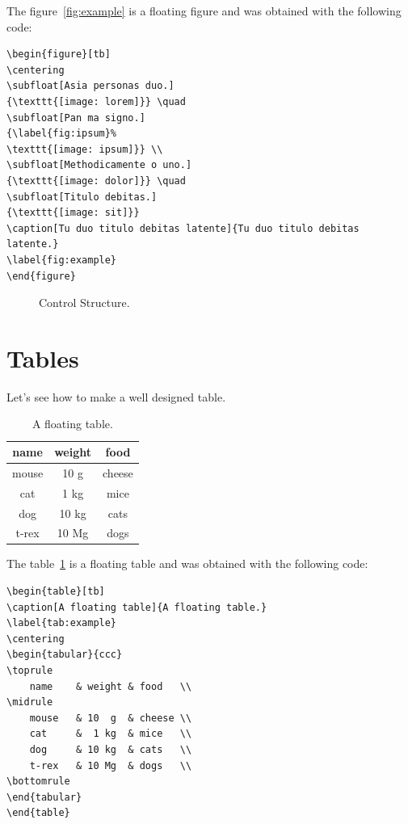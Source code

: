 The figure~\ref{fig:example} is a floating figure and was obtained with the following code:
\begin{lstlisting}
\begin{figure}[tb]
\centering
\subfloat[Asia personas duo.]
{\texttt{[image: lorem]}} \quad
\subfloat[Pan ma signo.]
{\label{fig:ipsum}%
\texttt{[image: ipsum]}} \\
\subfloat[Methodicamente o uno.]
{\texttt{[image: dolor]}} \quad
\subfloat[Titulo debitas.]
{\texttt{[image: sit]}}
\caption[Tu duo titulo debitas latente]{Tu duo titulo debitas latente.}
\label{fig:example}
\end{figure}
\end{lstlisting}

\begin{figure}[t]
    \centering
    \label{fig:control_diagram}
    \caption{Control Structure.}
\end{figure}

\lipsum[3-8]

\section{Tables}
Let's see how to make a well designed table.

\begin{table}[tb]
    \caption[A floating table]{A floating table.}
    \label{tab:example}
    \centering
    \begin{tabular}{ccc}
        \toprule
        name  & weight & food   \\
        \midrule
        mouse & 10 g   & cheese \\
        cat   & 1 kg   & mice   \\
        dog   & 10 kg  & cats   \\
        t-rex & 10 Mg  & dogs   \\
        \bottomrule
    \end{tabular}
\end{table}

The table~\ref{tab:example} is a floating table and was obtained with the following code:
\begin{lstlisting}
\begin{table}[tb]
\caption[A floating table]{A floating table.}
\label{tab:example}
\centering
\begin{tabular}{ccc}
\toprule
	name 	& weight & food	  \\ 
\midrule
	mouse	& 10  g	 & cheese \\
	cat		&  1 kg	 & mice	  \\
	dog		& 10 kg	 & cats   \\
	t-rex	& 10 Mg	 & dogs	  \\
\bottomrule 
\end{tabular}
\end{table}
\end{lstlisting}

\lipsum[1-2]